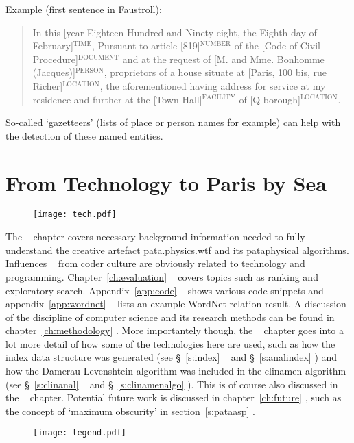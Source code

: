 Example (first sentence in Faustroll):

\begin{quote}
  In this [year Eighteen Hundred and Ninety-eight, the Eighth day of February]$^{\text{TIME}}$, Pursuant to article [819]$^{\text{NUMBER}}$ of the [Code of Civil Procedure]$^{\text{DOCUMENT}}$ and at the request of [M. and Mme. Bonhomme (Jacques)]$^{\text{PERSON}}$, proprietors of a house situate at [Paris, 100 bis, rue Richer]$^{\text{LOCATION}}$, the aforementioned having address for service at my residence and further at the [Town Hall]$^{\text{FACILITY}}$ of [Q borough]$^{\text{LOCATION}}$.
\end{quote}

So-called `gazetteers' (lists of place or person names for example) can help with the detection of these named entities.


\section{From Technology to Paris by Sea}

\begin{figure}[H]
\centering
  \texttt{[image: tech.pdf]}
\end{figure}

\vspace*{-0.6cm}

The  \tech~ chapter covers necessary background information needed to fully understand the creative artefact \url{pata.physics.wtf} and its pataphysical algorithms. Influences \inspi~ from coder culture are obviously related to technology and programming. Chapter~\ref{ch:evaluation} \eval~ covers topics such as ranking and exploratory search. Appendix~\ref{app:code} \appb~ shows various code snippets and appendix~\ref{app:wordnet} \appc~ lists an example WordNet relation result. A discussion of the discipline of computer science and its research methods can be found in chapter~\ref{ch:methodology} \metho. More importantely though, the  \anal~ chapter goes into a lot more detail of how some of the technologies here are used, such as how the index data structure was generated (see §~\ref{s:index} \imple~ and §~\ref{s:analindex} \anal) and how the Damerau-Levenshtein algorithm was included in the clinamen algorithm (see §~\ref{s:clinanal} \anal~ and §~\ref{s:clinamenalgo} \imple). This is of course also discussed in the  \imple~ chapter. Potential future work is discussed in chapter~\ref{ch:future} \aspi, such as the concept of `maximum obscurity' in section~\ref{s:pataasp} \aspi.

\vspace*{-0.2cm}

\begin{figure}[!htb]
\centering
  \texttt{[image: legend.pdf]}
\end{figure}

\stopcontents[chapters]
